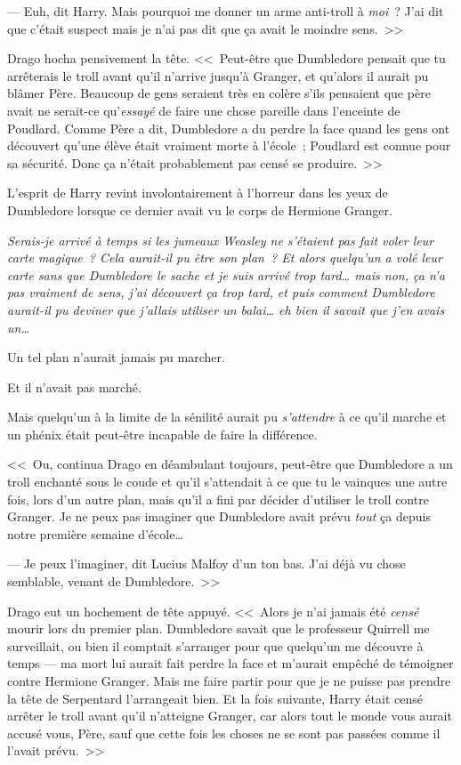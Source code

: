 --- Euh, dit Harry. Mais pourquoi me donner un arme anti-troll à \emph{moi}~? J'ai dit que c'était suspect mais je n'ai pas dit que ça avait le moindre sens.~>>

Drago hocha pensivement la tête. <<~Peut-être que Dumbledore pensait que tu arrêterais le troll avant qu'il n'arrive jusqu'à Granger, et qu'alors il aurait pu blâmer Père. Beaucoup de gens seraient très en colère s'ils pensaient que père avait ne serait-ce qu'\emph{essayé} de faire une chose pareille dans l'enceinte de Poudlard. Comme Père a dit, Dumbledore a du perdre la face quand les gens ont découvert qu'une élève était vraiment morte à l'école~; Poudlard est connue pour sa sécurité. Donc ça n'était probablement pas censé se produire.~>>

L'esprit de Harry revint involontairement à l'horreur dans les yeux de Dumbledore lorsque ce dernier avait vu le corps de Hermione Granger.

\emph{Serais-je arrivé à temps si les jumeaux Weasley ne s'étaient pas fait voler leur carte magique~? Cela aurait-il pu être son plan~? Et alors quelqu'un a volé leur carte sans que Dumbledore le sache et je suis arrivé trop tard… mais non, ça n'a pas vraiment de sens, j'ai découvert ça trop tard, et puis comment Dumbledore aurait-il pu deviner que j'allais utiliser un balai… eh bien il savait que j'en avais un…}

Un tel plan n'aurait jamais pu marcher.

Et il n'avait pas marché.

Mais quelqu'un à la limite de la sénilité aurait pu \emph{s'attendre} à ce qu'il marche et un phénix était peut-être incapable de faire la différence.

<<~Ou, continua Drago en déambulant toujours, peut-être que Dumbledore a un troll enchanté sous le coude et qu'il s'attendait à ce que tu le vainques une autre fois, lors d'un autre plan, mais qu'il a fini par décider d'utiliser le troll contre Granger. Je ne peux pas imaginer que Dumbledore avait prévu \emph{tout} ça depuis notre première semaine d'école…

--- Je peux l'imaginer, dit Lucius Malfoy d'un ton bas. J'ai déjà vu chose semblable, venant de Dumbledore.~>>

Drago eut un hochement de tête appuyé. <<~Alors je n'ai jamais été \emph{censé} mourir lors du premier plan. Dumbledore savait que le professeur Quirrell me surveillait, ou bien il comptait s'arranger pour que quelqu'un me découvre à temps — ma mort lui aurait fait perdre la face et m'aurait empêché de témoigner contre Hermione Granger. Mais me faire partir pour que je ne puisse pas prendre la tête de Serpentard l'arrangeait bien. Et la fois suivante, Harry était censé arrêter le troll avant qu'il n'atteigne Granger, car alors tout le monde vous aurait accusé vous, Père, sauf que cette fois les choses ne se sont pas passées comme il l'avait prévu.~>>

